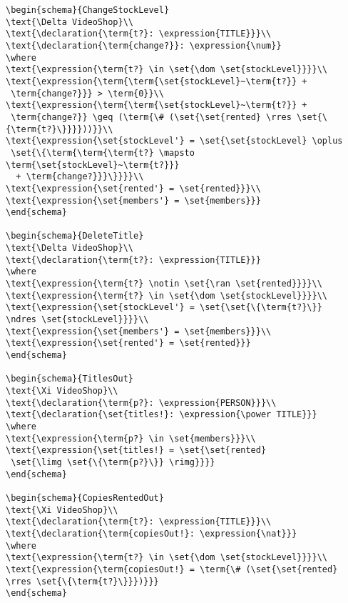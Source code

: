 \begin{verbatim}
\begin{schema}{ChangeStockLevel}
\text{\Delta VideoShop}\\
\text{\declaration{\term{t?}: \expression{TITLE}}}\\
\text{\declaration{\term{change?}}: \expression{\num}}
\where
\text{\expression{\term{t?} \in \set{\dom \set{stockLevel}}}}\\
\text{\expression{\term{\term{\set{stockLevel}~\term{t?}} +
 \term{change?}}} > \term{0}}\\
\text{\expression{\term{\term{\set{stockLevel}~\term{t?}} +
 \term{change?}} \geq (\term{\# (\set{\set{rented} \rres \set{\{\term{t?}\}}}}))}}\\
\text{\expression{\set{stockLevel'} = \set{\set{stockLevel} \oplus
 \set{\{\term{\term{\term{t?} \mapsto \term{\set{stockLevel}~\term{t?}}}
  + \term{change?}}}\}}}}\\
\text{\expression{\set{rented'} = \set{rented}}}\\
\text{\expression{\set{members'} = \set{members}}}
\end{schema}

\begin{schema}{DeleteTitle}
\text{\Delta VideoShop}\\
\text{\declaration{\term{t?}: \expression{TITLE}}}
\where
\text{\expression{\term{t?} \notin \set{\ran \set{rented}}}}\\
\text{\expression{\term{t?} \in \set{\dom \set{stockLevel}}}}\\
\text{\expression{\set{stockLevel'} = \set{\set{\{\term{t?}\}} 
\ndres \set{stockLevel}}}}\\
\text{\expression{\set{members'} = \set{members}}}\\
\text{\expression{\set{rented'} = \set{rented}}}
\end{schema}

\begin{schema}{TitlesOut}
\text{\Xi VideoShop}\\
\text{\declaration{\term{p?}: \expression{PERSON}}}\\
\text{\declaration{\set{titles!}: \expression{\power TITLE}}}
\where
\text{\expression{\term{p?} \in \set{members}}}\\
\text{\expression{\set{titles!} = \set{\set{rented}
 \set{\limg \set{\{\term{p?}\}} \rimg}}}}
\end{schema}

\begin{schema}{CopiesRentedOut}
\text{\Xi VideoShop}\\
\text{\declaration{\term{t?}: \expression{TITLE}}}\\
\text{\declaration{\term{copiesOut!}: \expression{\nat}}}
\where
\text{\expression{\term{t?} \in \set{\dom \set{stockLevel}}}}\\
\text{\expression{\term{copiesOut!} = \term{\# (\set{\set{rented} 
\rres \set{\{\term{t?}\}}})}}}
\end{schema}


\end{verbatim}
